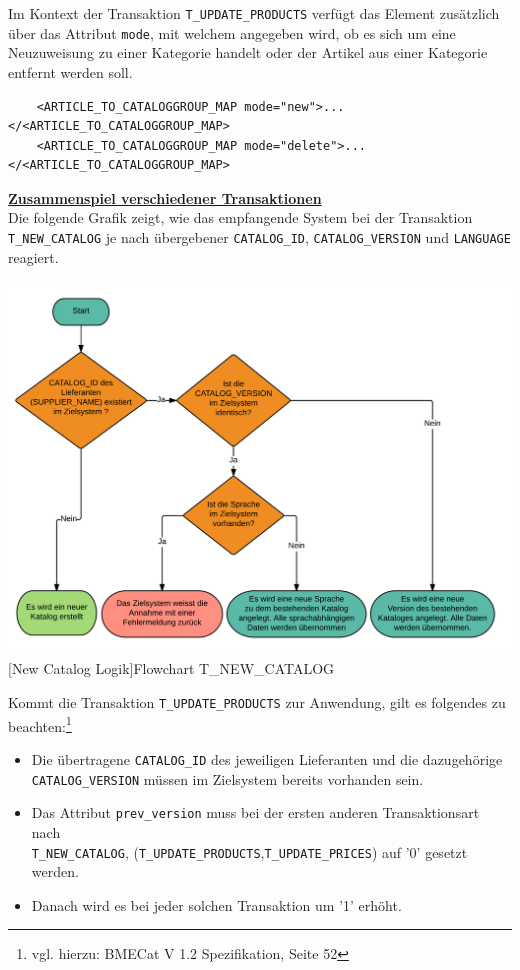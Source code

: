 	Im Kontext der Transaktion \texttt{T\_UPDATE\_PRODUCTS} verfügt das Element zusätzlich über das Attribut \texttt{mode}, mit welchem angegeben wird, ob es sich um eine Neuzuweisung zu einer Kategorie handelt oder der Artikel aus einer Kategorie entfernt werden soll.
	
	\begin{lstlisting}
	<ARTICLE_TO_CATALOGGROUP_MAP mode="new">...</<ARTICLE_TO_CATALOGGROUP_MAP>
	<ARTICLE_TO_CATALOGGROUP_MAP mode="delete">...</<ARTICLE_TO_CATALOGGROUP_MAP>
	\end{lstlisting}
	
	
	\textbf{\underline{Zusammenspiel verschiedener Transaktionen}}\\
	
	Die folgende Grafik zeigt, wie das empfangende System bei der Transaktion \texttt{T\_NEW\_CATALOG} je nach übergebener \texttt{CATALOG\_ID}, \texttt{CATALOG\_VERSION} und \texttt{LANGUAGE} reagiert.
	
	\begin{minipage}{\linewidth}
		\vspace{1em}
		\centering
		\includegraphics[width=0.65\linewidth]{img/newCatalogLogik}
		[New Catalog Logik]{Flowchart T\_NEW\_CATALOG}
		\label{fig:header}
		\vspace{1em}
	\end{minipage}
	
	Kommt die Transaktion \texttt{T\_UPDATE\_PRODUCTS} zur Anwendung, gilt es folgendes zu beachten:\footnote{vgl. hierzu: BMECat V 1.2 Spezifikation, Seite 52} 
	\begin{itemize}
		\item Die übertragene \texttt{CATALOG\_ID} des jeweiligen Lieferanten und die dazugehörige\\ \texttt{CATALOG\_VERSION} müssen im Zielsystem bereits vorhanden sein.
		\item Das Attribut \texttt{prev\_version} muss bei der ersten anderen Transaktionsart nach\\ \texttt{T\_NEW\_CATALOG}, (\texttt{T\_UPDATE\_PRODUCTS},\texttt{T\_UPDATE\_PRICES}) auf '0' gesetzt werden.
		\item Danach wird es bei jeder solchen Transaktion um '1' erhöht.
	\end{itemize}
	

